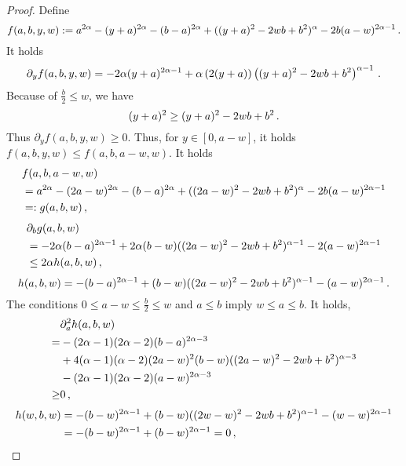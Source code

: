 \begin{proof} 
	Define
	\begin{equation*}
		f(a,b,y,w) := a^{2\alpha}-(y+a)^{2\alpha}-(b-a)^{2\alpha}+((y+a)^2 - 2 w b + b^2)^\alpha - 2 b (a-w)^{2\alpha-1}
		\, .
	\end{equation*}
	It holds
	\begin{equation*}
		\partial_y f(a,b,y,w) = -2\alpha(y+a)^{2\alpha-1}+\alpha\left( 2(y+a) \right)\left( (y+a)^2 - 2 w b + b^2 \right)^{\alpha-1}
		\, .
	\end{equation*}
	Because of $\frac{b}2 \leq w$, we have
	\begin{equation*}
		(y+a)^2 \geq  (y+a)^2 - 2 w b + b^2
		\, .
	\end{equation*}
	Thus $\partial_y f(a,b,y,w) \geq 0$.
	Thus, for $y\in[0,a-w]$, it holds $f(a,b,y,w) \leq f(a,b,a-w,w)$. It holds
	\begin{align*}
		&f(a,b,a-w,w) 
		\\&= a^{2\alpha}-(2a-w)^{2\alpha}-(b-a)^{2\alpha}+((2a-w)^2 - 2 w b + b^2)^\alpha - 2 b (a-w)^{2\alpha-1} 
		\\&=: g(a,b,w)
		\, ,
	\end{align*}
	\begin{align*}
		&\partial_b g(a,b,w) 
		\\&= -2\alpha(b-a)^{2\alpha-1}+2\alpha(b-w)((2a-w)^2 - 2 w b + b^2)^{\alpha-1} - 2 (a-w)^{2\alpha-1} 
		\\&\leq  2\alpha h(a,b,w)
		\, ,
	\end{align*}
	\begin{equation*}
		h(a,b,w) = -(b-a)^{2\alpha-1}+(b-w)((2a-w)^2 - 2 w b + b^2)^{\alpha-1} -  (a-w)^{2\alpha-1}
		\, .
	\end{equation*}
	The conditions $0\leq a-w \leq \frac b2 \leq w$ and $a \leq b$ imply $w \leq a \leq b$. It holds,
	\begin{align*}
		&\partial_a^2 h(a,b,w) \\= &-(2\alpha-1)(2\alpha-2)(b-a)^{2\alpha-3}\\&+4(\alpha-1)(\alpha-2)(2a-w)^2(b-w)((2a-w)^2 - 2 w b + b^2)^{\alpha-3} \\&-  (2\alpha-1)(2\alpha-2)(a-w)^{2\alpha-3} \\\geq&0
		\, ,
	\end{align*}
	\begin{align*}
		h(w,b,w) 
		&=
		-(b-w)^{2\alpha-1}+(b-w)((2w-w)^2 - 2 w b + b^2)^{\alpha-1} -  (w-w)^{2\alpha-1}
		\\&=
		-(b-w)^{2\alpha-1}+(b-w)^{2\alpha-1} = 0
		\eqcm

\end{align*}
\end{proof}
